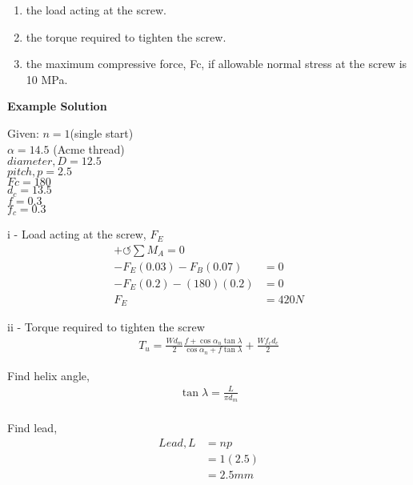 \documentclass[a4paper, fleqn]{article}
\begin{document}
\begin{enumerate}[label=(\roman*)]
    \item the load acting at the screw.

    \item the torque required to tighten the screw.

    \item the maximum compressive force, Fc, if allowable normal stress at the screw is 10 MPa.
\end{enumerate}


\textbf{Example Solution}

Given:
$n = 1$(single start)\\
$\alpha = 14.5$ (Acme thread)\\
$diameter,D = 12.5$\\
$pitch,p = 2.5$\\
$Fc = 180$\\
$d_c = 13.5$\\
$f = 0.3$\\
$f_c = 0.3$\\
\vspace{10pt}

i - Load acting at the screw, $F_E$
\begin{equation*}
    \begin{aligned}
    +\circlearrowleft \sum M_A =0\\  
    -F_E(0.03)-F_B(0.07) &=0\\ 
    -F_E(0.2)-(180)(0.2) &=0\\ 
    F_E &= 420  N
    \end{aligned}
\end{equation*}

ii - Torque required to tighten the screw
\begin{equation*}
    \begin{aligned}
    T_u = \frac{Wd_m}{2} \frac{f+\cos\alpha_n \tan\lambda}{\cos\alpha_n + f\tan\lambda} + \frac{Wf_c d_c}{2}
    \end{aligned}
\end{equation*}

Find helix angle,
\begin{equation*}
    \begin{aligned}
    \tan\lambda = \frac{L}{\pi d_m}\\
    \end{aligned}
\end{equation*}

Find lead,
\begin{equation*}
    \begin{aligned}
    Lead, L &=np\\
    &=1(2.5)\\
    &=2.5mm    
    \end{aligned}
\end{equation*}
\end{document}
